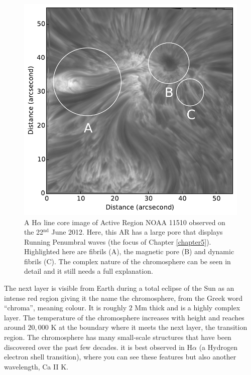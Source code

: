     \begin{figure}
        \centering
        \includegraphics[width=\textwidth]{Chromo.pdf}
        \caption{
                 A H$\alpha$ line core image of Active Region NOAA 11510 observed on the 22$^{\mathrm{nd}}$ June 2012.
                 Here, this AR has a large pore that displays Running Penumbral waves (the focus of Chapter \ref{chapter5}).
                 Highlighted here are fibrils (A), the magnetic pore (B) and dynamic fibrils (C).
                 The complex nature of the chromosphere can be seen in detail and it still needs a full explanation.
                }
        \label{fig:chromosphere}
    \end{figure}   

    The next layer is visible from Earth during a total eclipse of the Sun as an intense red region giving it the name the chromosphere, from the Greek word ``chroma'', meaning colour.
    It is roughly $2$ Mm thick and is a highly complex layer.
    The temperature of the chromosphere increases with height and reaches around $20,000$ K at the boundary where it meets the next layer, the transition region.    
    The chromosphere has many small-scale structures that have been discovered over the past few decades.
    it is best observed in H$\alpha$ (a Hydrogen electron shell transition), where you can see these features but also another wavelength, Ca II K. 
        
